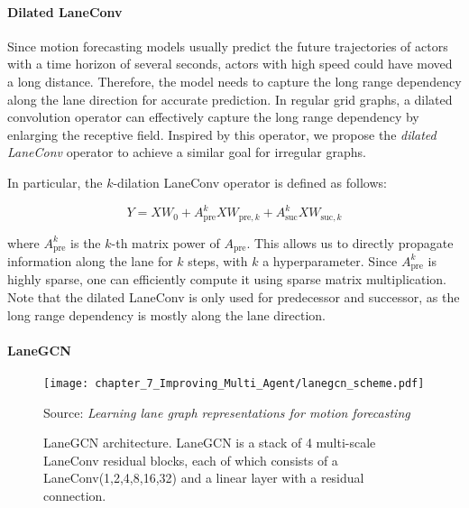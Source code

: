 \paragraph{Dilated LaneConv}
\label{par:7_improving_efficiency_dilated_laneconv}

Since motion forecasting models usually predict the future trajectories of actors with a time horizon of several seconds, actors with high speed could have moved a long distance. Therefore, the model needs to capture the long range dependency along the lane direction for accurate prediction. In regular grid graphs, a dilated convolution operator \cite{yu2015multi} can effectively capture the long range dependency by enlarging the receptive field. Inspired by this operator, we propose the \textit{dilated LaneConv} operator to achieve a similar goal for irregular graphs. 

In particular, the $k$-dilation LaneConv operator is defined as follows:

\begin{equation}
	Y = XW_0 + A_{\text{pre}}^k X W_{\text{pre},k} + A_{\text{suc}}^k X W_{\text{suc},k}
	\label{eqn:dilated_laneconv}
\end{equation}

where $A_{\text{pre}}^k$ is the $k$-th matrix power of $A_{\text{pre}}$. 
This  allows us to directly propagate information along the lane for $k$ steps, with $k$ a hyperparameter. Since $A_{\text{pre}}^k$ is highly sparse, one can efficiently compute it using sparse matrix multiplication. Note that the dilated LaneConv is only used for predecessor and successor, as the long range dependency is mostly along the lane direction.

\paragraph{LaneGCN}
\label{par:7_improving_efficiency_lanegcn}

\begin{figure}[t]                               
	\begin{center}
		\texttt{[image: chapter\_7\_Improving\_Multi\_Agent/lanegcn\_scheme.pdf]}
	\end{center}
	\caption[LaneGCN architecture]{LaneGCN architecture. LaneGCN is a stack of 4 multi-scale LaneConv residual blocks, each of which consists of a LaneConv(1,2,4,8,16,32) and a linear layer with a residual connection.}
	Source: \textit{Learning lane graph representations for motion forecasting} \cite{liang2020learning}
	\label{fig:chapter_7_Improving_Multi_Agent/improving_efficiency_lanegcn}
\end{figure}

